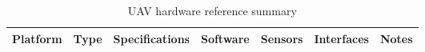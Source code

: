 \begin{table}[!htbp]
  \centering
  \caption{UAV hardware reference summary}
  \label{tab:hw-ref}

  \begingroup
    \setlength{\tabcolsep}{3.5pt}   %
    \renewcommand{\arraystretch}{1.05}
    \scriptsize                    %

    \begin{tabularx}{\textwidth}{@{}
      >{\raggedright\arraybackslash}p{2.2cm}  %
      >{\raggedright\arraybackslash}p{1.2cm}  %
      >{\raggedright\arraybackslash}X  %
      >{\raggedright\arraybackslash}p{2.1cm}  %
      >{\raggedright\arraybackslash}p{2.4cm}  %
      >{\raggedright\arraybackslash}p{2.4cm}  %
      >{\raggedright\arraybackslash}p{1cm}         %
    @{}}
      \toprule
      \textbf{Platform} & \textbf{Type} & \textbf{Specifications} & \textbf{Software} &
      \textbf{Sensors} & \textbf{Interfaces} & \textbf{Notes} \\
      \midrule


\end{tabularx}
\end{table}
